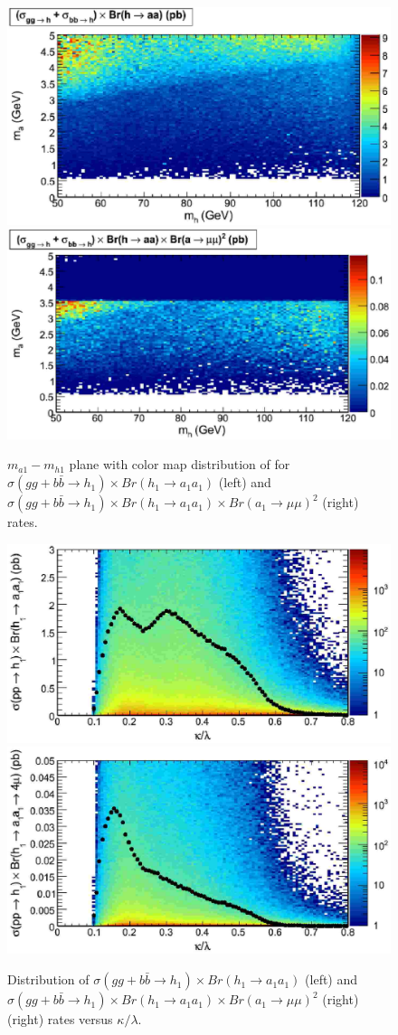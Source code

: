 \documentclass[aps,12pt,superscriptaddress,nofootinbib,floatfix,showpacs]{revtex4}
\begin{document}
\begin{figure}[h]
\includegraphics[width=0.5\linewidth]{plots/cs1.eps}%
\includegraphics[width=0.5\linewidth]{plots/cs2.eps}%
\caption{$m_{a1}-m_{h1}$ plane with
color map distribution of
for $\sigma(gg+b\bar{b}\to h_1)\times Br(h_1\to a_1 a_1)$ (left) 
and $\sigma(gg+b\bar{b}\to h_1)\times Br(h_1\to a_1 a_1)
\times Br(a_1\to \mu\mu)^2$ (right) rates.
\label{cs2}}
\end{figure}
\begin{figure}[h]
\includegraphics[width=0.5\linewidth]{plots/sig-brh2a_vs_kaplam.eps}%
\includegraphics[width=0.5\linewidth]{plots/sig-brh2a-bra2mu_vs_kaplam.eps}%
\caption{
Distribution of
$\sigma(gg+b\bar{b}\to h_1)\times Br(h_1\to a_1 a_1)$ (left)
and 
$\sigma(gg+b\bar{b}\to h_1)\times Br(h_1\to a_1 a_1)
\times Br(a_1\to \mu\mu)^2$ (right) (right)
rates
versus  $\kappa/\lambda$.
\label{sig-brh2a_vs_kaplam}}
\end{figure}
\end{document}
